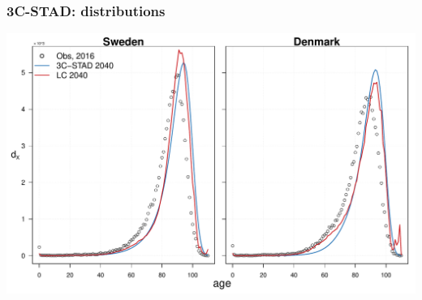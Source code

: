 \documentclass[12pt, xcolor=table]{beamer}  %
\begin{document}
\begin{frame}[noframenumbering]\frametitle{3C-STAD: distributions}

\vspace{-0.5cm}
	
	
	\begin{center}	
		\vspace{0.2cm}
		
		\includegraphics[scale=.42]{Figures/Ch3/F_dist}
		
	\end{center}
	
\end{frame}

\end{document}
